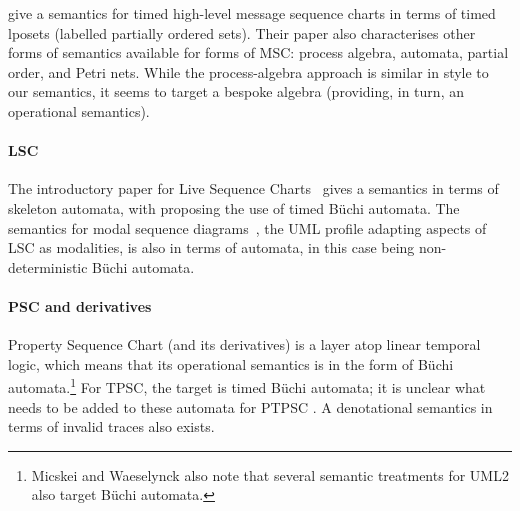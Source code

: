 \textcite{Kim06-THMSC} give a semantics for timed high-level message
sequence charts in terms of timed lposets (labelled partially ordered
sets).  Their paper also characterises other forms of semantics
available for forms of MSC: process algebra, automata, partial order,
and Petri nets.  While the process-algebra approach is similar in
style to our \tockcsp{} semantics, it seems to target a bespoke
algebra (providing, in turn, an operational semantics).

\paragraph{LSC}

The introductory paper for Live Sequence Charts~\cite{lsc} gives a
semantics in terms of skeleton automata, with \textcite{Brill04-LSCintro}
proposing the use of timed B\"uchi automata.
The semantics for modal sequence diagrams~\cite{Harel08-ModalSD}, the
UML profile adapting aspects of LSC as modalities, is also in terms of
automata, in this case being
non-deterministic B\"uchi automata.

\paragraph{PSC and derivatives}

Property Sequence Chart (and its derivatives) is a layer atop linear
temporal logic, which means that its operational semantics is in the
form of B\"uchi automata.\footnote{ Micskei and Waeselynck also note
  that several semantic treatments for UML2 also target B\"uchi
  automata.}  For TPSC, the target is timed B\"uchi automata; it is
unclear what needs to be added to these automata for PTPSC .
A denotational semantics in terms of invalid traces also exists.

